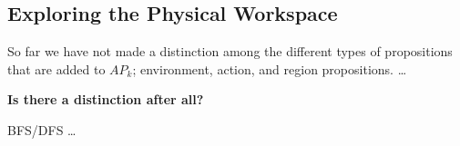 \subsection{Exploring the Physical Workspace}

So far we have not made a distinction among the different types of propositions that are added to $AP_k$; environment, action, and region propositions. \ldots

\textbf{Is there a distinction after all?}

BFS/DFS \ldots


